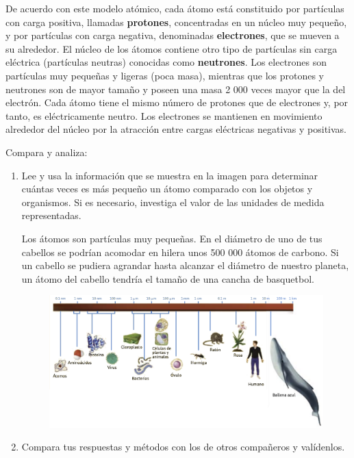 \documentclass[11pt]{book}
\begin{document}
De acuerdo con este modelo atómico, cada átomo está constituido por partículas
con carga positiva, llamadas \textbf{protones}, concentradas en un núcleo muy pequeño, y por
partículas con carga negativa, denominadas \textbf{electrones}, que se mueven a su alrededor.
El núcleo de los átomos contiene otro tipo de partículas sin carga eléctrica (partículas
neutras) conocidas como \textbf{neutrones}. Los electrones son partículas muy pequeñas y
ligeras (poca masa), mientras que los protones y neutrones son de mayor tamaño y
poseen una masa 2 000 veces mayor que la del electrón. Cada átomo tiene el mismo
número de protones que de electrones y, por tanto, es eléctricamente neutro. Los electrones
se mantienen en movimiento alrededor del núcleo por la atracción entre cargas
eléctricas negativas y positivas.


\begin{boxK}
  Compara y analiza:\\
  \begin{enumerate}
    \item Lee y usa la información que se muestra en la imagen para determinar cuántas
          veces es más pequeño un átomo comparado con los objetos y organismos. Si es
          necesario, investiga el valor de las unidades de medida representadas.
          \begin{boxF}
            Los átomos son partículas muy pequeñas. En el diámetro de uno de tus cabellos se podrían
            acomodar en hilera unos 500 000 átomos de carbono. Si un cabello se pudiera agrandar
            hasta alcanzar el diámetro de nuestro planeta, un átomo del cabello tendría el tamaño de
            una cancha de basquetbol.
          \end{boxF}

          \begin{figure}[H]
            \centering
            \includegraphics[width=.8\textwidth]{escala.png}
          \end{figure}


    \item Compara tus respuestas y métodos con los de otros compañeros y valídenlos.
  \end{enumerate}
\end{boxK}
\newpage
\end{document}

